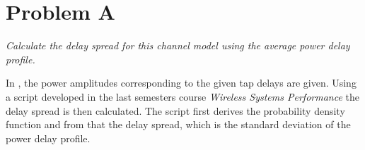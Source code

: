 \section{Problem A}
\textit{Calculate the delay spread for this channel model using the average power delay profile.}

In , the power amplitudes corresponding to the given tap delays are given. Using a script developed in the last semesters course \textit{Wireless Systems Performance} the delay spread is then calculated. The script first derives the probability density function and from that the delay spread, which is the standard deviation of the power delay profile. 

